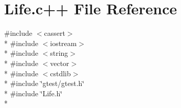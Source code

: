 \hypertarget{Life_8c_09_09}{\section{Life.\-c++ File Reference}
\label{Life_8c_09_09}
}
{\ttfamily \#include $<$cassert$>$}\\*
{\ttfamily \#include $<$iostream$>$}\\*
{\ttfamily \#include $<$string$>$}\\*
{\ttfamily \#include $<$vector$>$}\\*
{\ttfamily \#include $<$cstdlib$>$}\\*
{\ttfamily \#include \char`\"{}gtest/gtest.\-h\char`\"{}}\\*
{\ttfamily \#include \char`\"{}Life.\-h\char`\"{}}\\*
